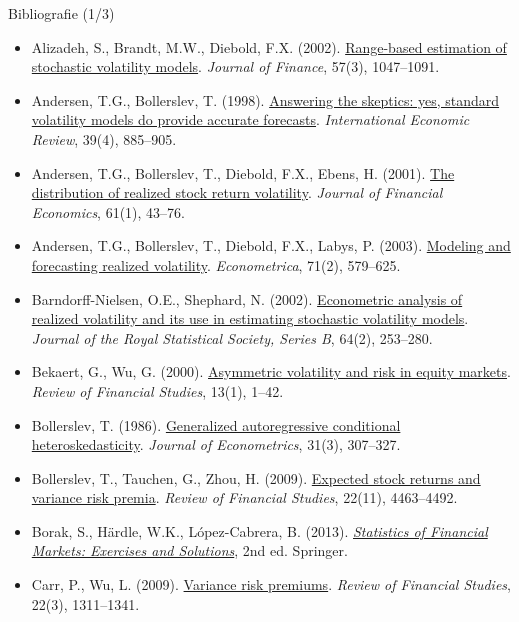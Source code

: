 \begin{frame}{Bibliografie (1/3)}
\itemsize{\tiny}
\begin{itemize}
    \item Alizadeh, S., Brandt, M.W., Diebold, F.X. (2002). \href{https://doi.org/10.1111/1540-6261.00454}{Range-based estimation of stochastic volatility models}. \textit{Journal of Finance}, 57(3), 1047--1091.
    \item Andersen, T.G., Bollerslev, T. (1998). \href{https://doi.org/10.2307/2527343}{Answering the skeptics: yes, standard volatility models do provide accurate forecasts}. \textit{International Economic Review}, 39(4), 885--905.
    \item Andersen, T.G., Bollerslev, T., Diebold, F.X., Ebens, H. (2001). \href{https://doi.org/10.1016/S0304-405X(01)00055-1}{The distribution of realized stock return volatility}. \textit{Journal of Financial Economics}, 61(1), 43--76.
    \item Andersen, T.G., Bollerslev, T., Diebold, F.X., Labys, P. (2003). \href{https://doi.org/10.1111/1468-0262.00418}{Modeling and forecasting realized volatility}. \textit{Econometrica}, 71(2), 579--625.
    \item Barndorff-Nielsen, O.E., Shephard, N. (2002). \href{https://doi.org/10.1111/1467-9868.00336}{Econometric analysis of realized volatility and its use in estimating stochastic volatility models}. \textit{Journal of the Royal Statistical Society, Series B}, 64(2), 253--280.
    \item Bekaert, G., Wu, G. (2000). \href{https://doi.org/10.1093/rfs/13.1.1}{Asymmetric volatility and risk in equity markets}. \textit{Review of Financial Studies}, 13(1), 1--42.
    \item Bollerslev, T. (1986). \href{https://doi.org/10.1016/0304-4076(86)90063-1}{Generalized autoregressive conditional heteroskedasticity}. \textit{Journal of Econometrics}, 31(3), 307--327.
    \item Bollerslev, T., Tauchen, G., Zhou, H. (2009). \href{https://doi.org/10.1093/rfs/hhp008}{Expected stock returns and variance risk premia}. \textit{Review of Financial Studies}, 22(11), 4463--4492.
    \item Borak, S., Härdle, W.K., López-Cabrera, B. (2013). \href{https://doi.org/10.1007/978-3-642-33929-5}{\textit{Statistics of Financial Markets: Exercises and Solutions}}, 2nd ed. Springer.
    \item Carr, P., Wu, L. (2009). \href{https://doi.org/10.1093/rfs/hhn038}{Variance risk premiums}. \textit{Review of Financial Studies}, 22(3), 1311--1341.

\end{itemize}
\end{frame}
